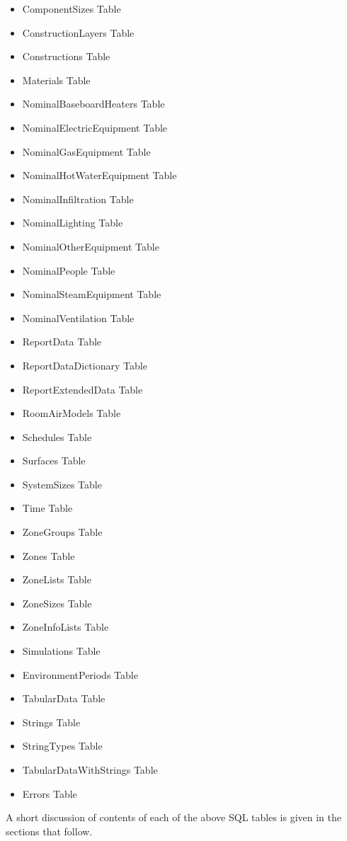 \begin{itemize}
  \item ComponentSizes Table
  \item ConstructionLayers Table
  \item Constructions Table
  \item Materials Table
  \item NominalBaseboardHeaters Table
  \item NominalElectricEquipment Table
  \item NominalGasEquipment Table
  \item NominalHotWaterEquipment Table
  \item NominalInfiltration Table
  \item NominalLighting Table
  \item NominalOtherEquipment Table
  \item NominalPeople Table
  \item NominalSteamEquipment Table
  \item NominalVentilation Table
  \item ReportData Table
  \item ReportDataDictionary Table
  \item ReportExtendedData Table
  \item RoomAirModels Table
  \item Schedules Table
  \item Surfaces Table
  \item SystemSizes Table
  \item Time Table
  \item ZoneGroups Table
  \item Zones Table
  \item ZoneLists Table
  \item ZoneSizes Table
  \item ZoneInfoLists Table
  \item Simulations Table
  \item EnvironmentPeriods Table
  \item TabularData Table
  \item Strings Table
  \item StringTypes Table
  \item TabularDataWithStrings Table
  \item Errors Table
\end{itemize}

A short discussion of contents of each of the above SQL tables is given in the sections that follow.

